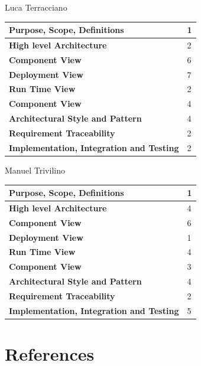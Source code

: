 \documentclass[a4paper]{article}
\begin{document}
Luca Terracciano

\begin{center}
\begin{tabular}{|l | l |}
    \hline \bf{Purpose, Scope, Definitions} & 1 \\ \hline
    \bf{High level Architecture}  & 2 \\ \hline
    \bf{Component View} & 6 \\ \hline
    \bf{Deployment View} & 7 \\ \hline
    \bf{Run Time View} & 2\\ \hline
    \bf{Component View} & 4 \\ \hline
    \bf{Architectural Style and Pattern} & 4 \\ \hline
    \bf{Requirement Traceability} & 2 \\ \hline
    \bf{Implementation, Integration and Testing} & 2 \\ \hline
\end{tabular}
\end{center}

Manuel Trivilino

\begin{center}
\begin{tabular}{|l | l |}
    \hline \bf{Purpose, Scope, Definitions} & 1 \\ \hline
    \bf{High level Architecture}  & 4 \\ \hline
    \bf{Component View} & 6 \\ \hline
    \bf{Deployment View} & 1 \\ \hline
    \bf{Run Time View} & 4\\ \hline
    \bf{Component View} & 3 \\ \hline
    \bf{Architectural Style and Pattern} & 4 \\ \hline
    \bf{Requirement Traceability} & 2 \\ \hline
    \bf{Implementation, Integration and Testing} & 5 \\ \hline
\end{tabular}
\end{center}

\section{References}
\end{document}
